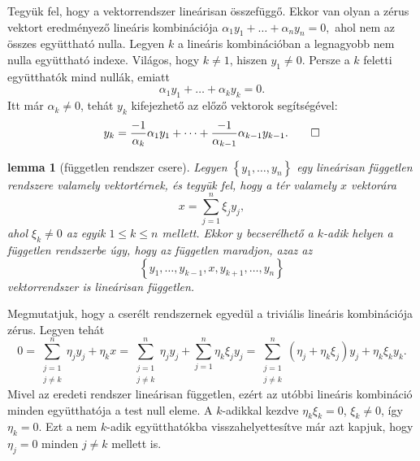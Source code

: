 \documentclass[9pt, showtrims]{memoir}
\makeatletter
\renewenvironment{proof}[1][\proofname]
    {\par\pushQED{\qed}%
    \normalfont \topsep6\p@\@plus6\p@\relax
    \trivlist
    \item[\hskip\labelsep
        \itshape
    #1\@addpunct{:}]\ignorespaces}
    {\popQED\endtrivlist\@endpefalse}
\theoremstyle{plain}
\newtheorem{lemma}[proposition]{lemma}
\theoremstyle{remark}
\theoremstyle{definition}
\makeatother
\begin{document}
\begin{proof}
    Tegyük fel, hogy a vektorrendszer lineárisan összefüggő.
    Ekkor van olyan a zérus vektort eredményező lineáris kombinációja
    \(
    \alpha_1y_1+\dots+\alpha_ny_n=0,
    \)
    ahol nem az összes együttható nulla.
    Legyen $k$ a lineáris kombinációban a legnagyobb nem nulla együttható indexe.
    Világos, hogy $k\neq 1$, 
    hiszen $y_1\neq 0$.
    Persze a $k$ feletti együtthatók mind nullák,
    emiatt
    \[
        \alpha_1y_1+\dots+\alpha_ky_k=0.
    \]
    Itt már $\alpha_k\neq 0$, tehát $y_k$ kifejezhető az előző vektorok segítségével:
    \[
        y_k=
        \frac{-1}{\alpha_k}\alpha_1y_1+\dots+\frac{-1}{\alpha_{k-1}}\alpha_{k-1}y_{k-1}.\qedhere
    \]
\end{proof}

\begin{lemma}[független rendszer csere]\label{le:fgtlncsere}
    Legyen $\left\{ y_1,\dots,y_n \right\}$ egy lineárisan független rendszere valamely vektortérnek,
    és tegyük fel, hogy a tér valamely $x$ vektorára
    \[
        x=\sum_{j=1}^n\xi_jy_j,
    \]
    ahol $\xi_k\neq 0$ az egyik $1\leq k\leq n$ mellett. 
    Ekkor $y$ becserélhető a $k$-adik helyen a független rendszerbe 
    úgy, hogy az független maradjon, azaz az
    \[
        \left\{ y_1,\dots,y_{k-1},x,y_{k+1},\dots,y_n \right\}
    \]
    vektorrendszer is lineárisan független.
\end{lemma}
\begin{proof}
    Megmutatjuk, hogy a cserélt rendszernek egyedül a triviális lineáris kombinációja zérus.
    Legyen tehát
    \[
        0
        =\sum_{\substack{j=1\\j\neq k}}^n\eta_jy_j+\eta_kx
        =\sum_{\substack{j=1\\j\neq k}}^n\eta_jy_j+\sum_{j=1}^n\eta_k\xi_jy_j
        =\sum_{\substack{j=1\\j\neq k}}^n\left( \eta_j+\eta_k\xi_j \right)y_j+\eta_k\xi_ky_k.
    \]
    Mivel az eredeti rendszer lineárisan független,
    ezért az utóbbi lineáris kombináció minden együtthatója a test null eleme.
    A $k$-adikkal kezdve $\eta_k\xi_k=0$, $\xi_k\neq 0$, így $\eta_k=0$.
    Ezt a nem $k$-adik együtthatókba visszahelyettesítve
    már azt kapjuk, hogy $\eta_j=0$ minden $j\neq k$ mellett is.
\end{proof}
\end{document}
